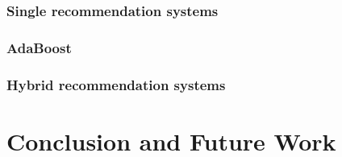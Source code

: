 \documentclass[10pt]{reportMaster}
\begin{document}
\subsection{Single recommendation systems}


\subsection{AdaBoost}

\subsection{Hybrid recommendation systems}





\chapter{Conclusion and Future Work}
\label{chap:conclustionAndFutureWork}









\end{document}
